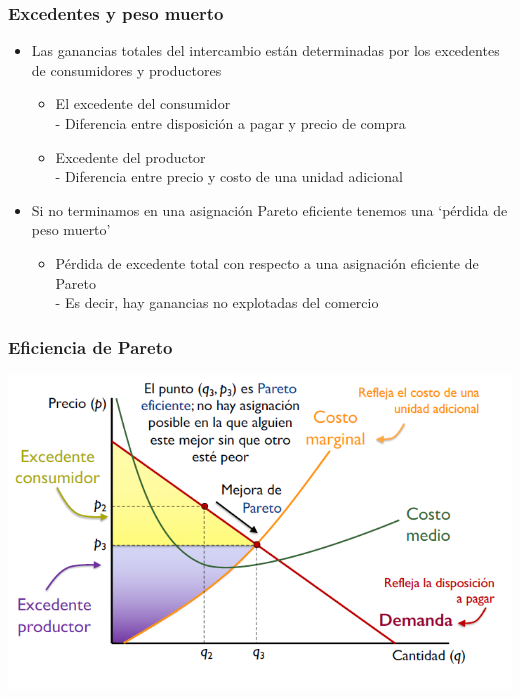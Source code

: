 \documentclass{beamer}
\begin{document}
\begin{frame}
\frametitle{Excedentes y peso muerto}
\begin{itemize}
    \item Las ganancias totales del intercambio están determinadas por los excedentes de consumidores y productores\vspace{2mm}
    \begin{itemize}
        \item El excedente del consumidor \\ - Diferencia entre disposición a pagar y precio de compra\vspace{1mm}
        \item Excedente del productor \\ - Diferencia entre precio y costo de una unidad adicional\vspace{4mm}
    \end{itemize}
    \item Si no terminamos en una asignación Pareto eficiente tenemos una ‘pérdida de peso muerto’\vspace{2mm}
    \begin{itemize}
        \item Pérdida de excedente total con respecto a una asignación eficiente de Pareto \\
        - Es decir, hay ganancias no explotadas del comercio
    \end{itemize}
    \end{itemize}
\end{frame}



\begin{frame}
\frametitle{Eficiencia de Pareto}
\includegraphics[scale=0.6]{Slides Principios de Economia/Figures/Tema_06.40_excedente3.png}
\end{frame}
\end{document}
